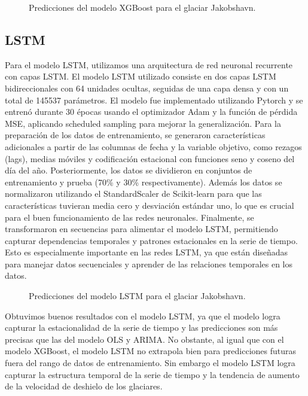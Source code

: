 \documentclass[sigconf,language=spanish]{acmart}
\begin{document}
\begin{figure}[htbp]
   \centering
   
    \caption{Predicciones del modelo XGBoost para el glaciar Jakobshavn.}
    \label{fig:jakobshavn_xgb}
\end{figure}


\subsection{LSTM}

Para el modelo LSTM, utilizamos una arquitectura de red neuronal recurrente con capas LSTM.
El modelo LSTM utilizado consiste en dos capas LSTM bidireccionales con 64 unidades ocultas, seguidas de una capa densa y con un total de 145537 parámetros. 
El modelo fue implementado utilizando Pytorch \cite{Ansel_PyTorch_2_Faster_2024} y se entrenó durante 30 épocas usando el optimizador Adam y la función de pérdida MSE, aplicando scheduled sampling para mejorar la generalización.
Para la preparación de los datos de entrenamiento, se generaron características adicionales a partir de las columnas de fecha y la variable objetivo, como rezagos (lags), medias móviles y codificación estacional con funciones seno y coseno del día del año. Posteriormente, los datos se dividieron en conjuntos de entrenamiento y prueba (70\% y 30\% respectivamente).
Además los datos se normalizaron utilizando el StandardScaler de Scikit-learn para que las características tuvieran media cero y desviación estándar uno, lo que es crucial para el buen funcionamiento de las redes neuronales.
Finalmente, se transformaron en secuencias para alimentar el modelo LSTM, permitiendo capturar dependencias temporales y patrones estacionales en la serie de tiempo.
Esto es especialmente importante en las redes LSTM, ya que están diseñadas para manejar datos secuenciales y aprender de las relaciones temporales en los datos.


\begin{figure}[htbp]
   \centering
   
    \caption{Predicciones del modelo LSTM para el glaciar Jakobshavn.}
    \label{fig:jakobshavn_lstm}
\end{figure}

Obtuvimos buenos resultados con el modelo LSTM, ya que el modelo logra capturar la estacionalidad de la serie de tiempo y las predicciones son más precisas que las del modelo OLS y ARIMA.
No obstante, al igual que con el modelo XGBoost, el modelo LSTM no extrapola bien para predicciones futuras fuera del rango de datos de entrenamiento. 
Sin embargo el modelo LSTM logra capturar la estructura temporal de la serie de tiempo y la tendencia de aumento 
de la velocidad de deshielo de los glaciares.
\end{document}
